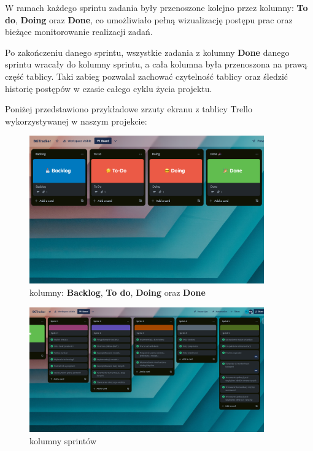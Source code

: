 \documentclass[12pt,a4paper]{article}
\begin{document}
\begin{enumerate}
W ramach każdego sprintu zadania były przenoszone kolejno przez kolumny: \textbf{To do}, \textbf{Doing} oraz \textbf{Done}, co umożliwiało pełną wizualizację postępu prac oraz bieżące monitorowanie realizacji zadań.

Po zakończeniu danego sprintu, wszystkie zadania z kolumny \textbf{Done} danego sprintu wracały do kolumny sprintu, a cała kolumna była przenoszona na prawą część tablicy. Taki zabieg pozwalał zachować czytelność tablicy oraz śledzić historię postępów w czasie całego cyklu życia projektu.

Poniżej przedstawiono przykładowe zrzuty ekranu z tablicy Trello wykorzystywanej w naszym projekcie:

\begin{figure}[H]
    \centering
    \includegraphics[width=0.9\textwidth]{media/trello1.png}
    \caption{kolumny: \textbf{Backlog}, \textbf{To do}, \textbf{Doing} oraz \textbf{Done}}
\end{figure}

\begin{figure}[H]
    \centering
    \includegraphics[width=0.9\textwidth]{media/trello2.png}
    \caption{kolumny sprintów}
\end{figure}


\end{enumerate}
\end{document}
